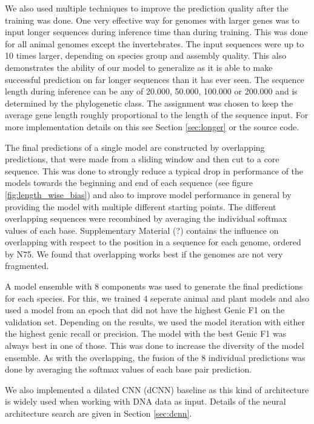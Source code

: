\documentclass{bioinfo}
\begin{document}
\begin{methods}
We also used multiple techniques to improve the prediction quality after the training was done. One very effective way for genomes with larger genes was to input longer sequences during inference time than during training. This was done for all animal genomes except the invertebrates. The input sequences were up to 10 times larger, depending on species group and assembly quality. This also demonstrates the ability of our model to generalize as it is able to make successful prediction on far longer sequences than it has ever seen. The sequence length during inference can be any of 20.000, 50.000, 100.000 or 200.000 and is determined by the phylogenetic class. The assignment was chosen to keep the average gene length roughly proportional to the length of the sequence input. For more implementation details on this see Section \ref{sec:longer} or the source code.
	
The final predictions of a single model are constructed by overlapping predictions, that were made from a sliding window and then cut to a core sequence. This was done to strongly reduce a typical drop in performance of the models towards the beginning and end of each sequence (see figure \ref{fig:length_wise_bias}) and also to improve model performance in general by providing the model with multiple different starting points. The different overlapping sequences were recombined by averaging the individual softmax values of each base. Supplementary Material (?) contains the influence on overlapping with respect to the position in a sequence for each genome, ordered by N75. We found that overlapping works best if the genomes are not very fragmented.

A model ensemble with 8 components was used to generate the final predictions for each species. For this, we trained 4 seperate animal and plant models and also used a model from an epoch that did not have the highest Genic F1 on the validation set. Depending on the results, we used the model iteration with either the highest genic recall or precision. The model with the best Genic F1 was always best in one of those. This was done to increase the diversity of the model ensemble. As with the overlapping, the fusion of the 8 individual predictions was done by averaging the softmax values of each base pair prediction.

We also implemented a dilated CNN (dCNN) baseline as this kind of architecture is widely used when working with DNA data as input. Details of the neural architecture search are given in Section \ref{sec:dcnn}.


\end{methods}
\end{document}
